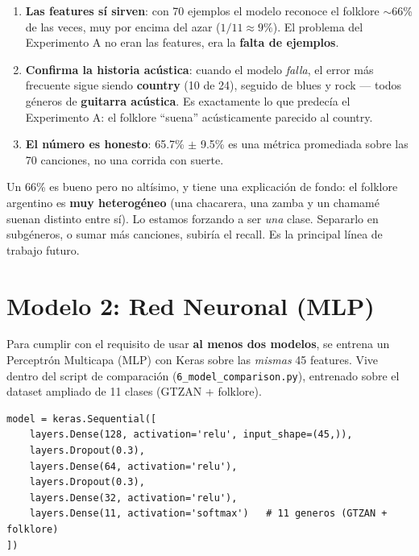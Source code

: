 \documentclass[11pt,a4paper]{article}
\newenvironment{ideabox}[1]{\begin{mdframed}[style=ideastyle,frametitle={#1}]}{\end{mdframed}}
\newenvironment{defenbox}[1]{\begin{mdframed}[style=defenstyle,frametitle={#1}]}{\end{mdframed}}
\begin{document}
\begin{ideabox}{Qué demuestra esto (y cómo conecta con el Experimento A)}
\begin{enumerate}[leftmargin=0.5cm]
  \item \textbf{Las features sí sirven}: con 70 ejemplos el modelo reconoce el
  folklore $\sim$66\% de las veces, muy por encima del azar ($1/11 \approx 9\%$).
  El problema del Experimento A no eran las features, era la \textbf{falta de
  ejemplos}.
  \item \textbf{Confirma la historia acústica}: cuando el modelo \emph{falla},
  el error más frecuente sigue siendo \textbf{country} (10 de 24), seguido de
  blues y rock --- todos géneros de \textbf{guitarra acústica}. Es exactamente lo
  que predecía el Experimento A: el folklore ``suena'' acústicamente parecido al
  country.
  \item \textbf{El número es honesto}: 65.7\% $\pm$ 9.5\% es una métrica
  promediada sobre las 70 canciones, no una corrida con suerte.
\end{enumerate}
\end{ideabox}

\begin{defenbox}{Por qué el folklore es difícil incluso así}
Un 66\% es bueno pero no altísimo, y tiene una explicación de fondo: el folklore
argentino es \textbf{muy heterogéneo} (una chacarera, una zamba y un chamamé
suenan distinto entre sí). Lo estamos forzando a ser \emph{una} clase. Separarlo
en subgéneros, o sumar más canciones, subiría el recall. Es la principal línea
de trabajo futuro.
\end{defenbox}

\section{Modelo 2: Red Neuronal (MLP)}

Para cumplir con el requisito de usar \textbf{al menos dos modelos}, se entrena
un Perceptrón Multicapa (MLP) con Keras sobre las \emph{mismas} 45 features. Vive
dentro del script de comparación (\texttt{6\_model\_comparison.py}), entrenado
sobre el dataset ampliado de 11 clases (GTZAN + folklore).

\begin{lstlisting}
model = keras.Sequential([
    layers.Dense(128, activation='relu', input_shape=(45,)),
    layers.Dropout(0.3),
    layers.Dense(64, activation='relu'),
    layers.Dropout(0.3),
    layers.Dense(32, activation='relu'),
    layers.Dense(11, activation='softmax')   # 11 generos (GTZAN + folklore)
])
\end{lstlisting}
\end{document}

